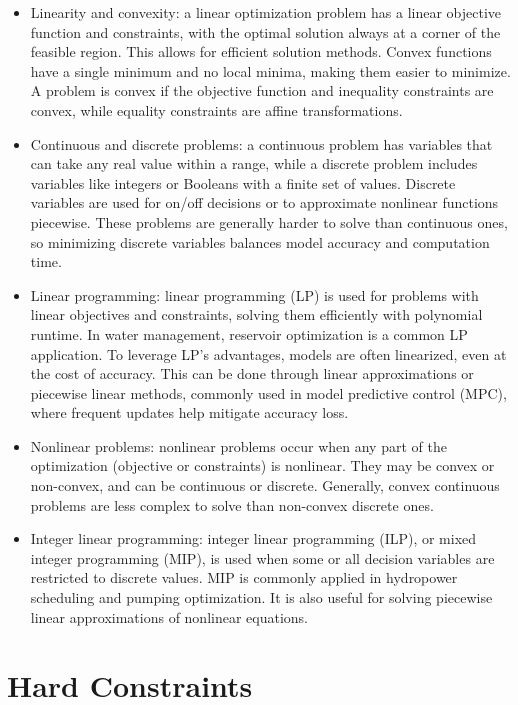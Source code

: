 \begin{itemize}
\item Linearity and convexity: a linear optimization problem has a linear objective function and constraints, with the optimal solution always at a corner of the feasible region. This allows for efficient solution methods. Convex functions have a single minimum and no local minima, making them easier to minimize. A problem is convex if the objective function and inequality constraints are convex, while equality constraints are affine transformations.

\item Continuous and discrete problems: a continuous problem has variables that can take any real value within a range, while a discrete problem includes variables like integers or Booleans with a finite set of values. Discrete variables are used for on/off decisions or to approximate nonlinear functions piecewise. These problems are generally harder to solve than continuous ones, so minimizing discrete variables balances model accuracy and computation time.

\item Linear programming: linear programming (LP) is used for problems with linear objectives and constraints, solving them efficiently with polynomial runtime. In water management, reservoir optimization is a common LP application. To leverage LP’s advantages, models are often linearized, even at the cost of accuracy. This can be done through linear approximations or piecewise linear methods, commonly used in model predictive control (MPC), where frequent updates help mitigate accuracy loss.

\item Nonlinear problems: nonlinear problems occur when any part of the optimization (objective or constraints) is nonlinear. They may be convex or non-convex, and can be continuous or discrete. Generally, convex continuous problems are less complex to solve than non-convex discrete ones.

\item Integer linear programming: integer linear programming (ILP), or mixed integer programming (MIP), is used when some or all decision variables are restricted to discrete values. MIP is commonly applied in hydropower scheduling and pumping optimization. It is also useful for solving piecewise linear approximations of nonlinear equations.
\end{itemize}


\section{Hard Constraints}

